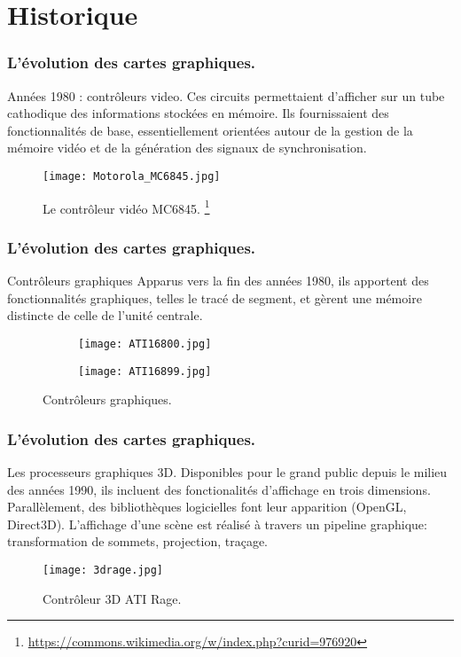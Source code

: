 \section{Historique}
\begin{frame}
    \frametitle{L'évolution des cartes graphiques.}
\begin{block}{Années 1980 : contrôleurs video.}
  Ces circuits permettaient d'afficher sur un tube cathodique 
  des informations stockées en mémoire. Ils fournissaient des fonctionnalités de base, essentiellement orientées
  autour de la gestion de la mémoire vidéo et de la génération des signaux de synchronisation. 
  \begin{figure}[ht]
    \centering
    \texttt{[image: Motorola\_MC6845.jpg]}
    \caption{Le contrôleur vidéo MC6845. \footnote{\tiny \url{https://commons.wikimedia.org/w/index.php?curid=976920}}}
    \label{fig:MC6845}
  \end{figure}
\end{block}
\end{frame}
\begin{frame}
  \frametitle{L'évolution des cartes graphiques.}
\begin{block}{Contrôleurs graphiques}
  Apparus vers la fin des années 1980, ils apportent des fonctionnalités graphiques, telles le tracé de segment, 
  et gèrent une mémoire distincte de celle de l'unité centrale.
   \begin{figure}[htbp]
    \centering
    \hfill
   \begin{subfigure}{0.4\textwidth}
    \texttt{[image: ATI16800.jpg]}
   \end{subfigure} 
   \hfill
   \begin{subfigure}{0.4\textwidth}
    \texttt{[image: ATI16899.jpg]}
   \end{subfigure} 
   \hfill
    \caption{Contrôleurs graphiques.}
    \label{fig:graphic_controllers}
   \end{figure}
\end{block}
\end{frame}
\begin{frame}
  \frametitle{L'évolution des cartes graphiques.}
\begin{block}{Les processeurs graphiques 3D.}
    Disponibles pour le grand public depuis le milieu des années 1990, ils incluent des fonctionalités
    d'affichage en trois dimensions. Parallèlement, des bibliothèques logicielles font leur apparition
    (OpenGL, Direct3D). L'affichage d'une scène est réalisé à travers un pipeline graphique: 
    transformation de sommets, projection, traçage.
    \begin{figure}[htbp]
        \centering
       \texttt{[image: 3drage.jpg]} 
        \caption{Contrôleur 3D ATI Rage.}
        \label{fig:ati_rage}
    \end{figure}
\end{block}
\end{frame}

